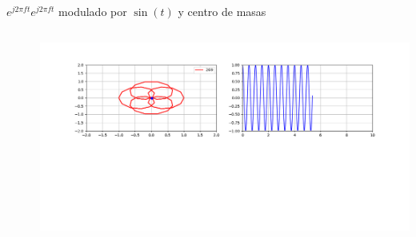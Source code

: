 \begin{frame}{$e^{j2\pi ft}$}{$e^{j2\pi ft}$ modulado por $\sin(t)$ y centro de masas }
   \handsonicon
   \begin{columns}[c]
      \hspace{2pt}
      \begin{column}{.3\textwidth}
         
      \end{column}
      \hspace{2pt}
      \vrule
      \hspace{2pt}
      \begin{column}{.3\textwidth}
         
      \end{column}
      \hspace{2pt}
      \vrule
      \hspace{2pt}
      \begin{column}{.4\textwidth}
         \centering\includegraphics[width=1.0\textwidth]{3_clase/euler3}
      \end{column}
      \hspace{2pt}
   \end{columns}
   \vfill
\end{frame}
